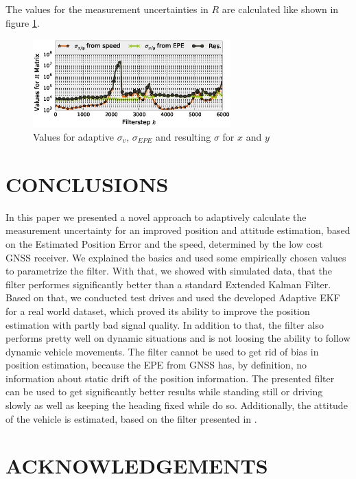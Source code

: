 \documentclass[a4paper,twoside]{article}
\begin{document}
The values for the measurement uncertainties in $R$ are calculated like shown in figure \ref{adaptive-R}.

\begin{figure}[ht]
\centering
\includegraphics[width=3.0in]{images/Extended-Kalman-Filter-CTRV-Adaptive-R}
\caption{Values for adaptive $\sigma_v$, $\sigma_{EPE}$ and resulting $\sigma$ for $x$ and $y$}
\label{adaptive-R}
\end{figure}

\section{\uppercase{Conclusions}}
\label{sec:conclusion}

\noindent In this paper we presented a novel approach to adaptively calculate the measurement uncertainty for an improved position and attitude estimation, based on the Estimated Position Error and the speed, determined by the low cost GNSS receiver.
We explained the basics and used some empirically chosen values to parametrize the filter. With that, we showed with simulated data, that the filter performes significantly better than a standard Extended Kalman Filter. Based on that, we conducted test drives and used the developed Adaptive EKF for a real world dataset, which proved its ability to improve the position estimation with partly bad signal quality. In addition to that, the filter also performs pretty well on dynamic situations and is not loosing the ability to follow dynamic vehicle movements.
The filter cannot be used to get rid of bias in position estimation, because the EPE from GNSS has, by definition, no information about static drift of the position information.
The presented filter can be used to get significantly better results while standing still or driving slowly as well as keeping the heading fixed while do so.
Additionally, the attitude of the vehicle is estimated, based on the filter presented in \cite{Madgwick2010}.

\section*{\uppercase{Acknowledgements}}
\end{document}
